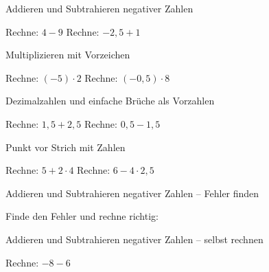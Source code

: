 \setcounter{aufgabe}{0}

\begin{aufgabe}{Addieren und Subtrahieren negativer Zahlen}
\begin{teile}
\teil Rechne: $4 - 9$ \leerfeld
\teil Rechne: $-2{,}5 + 1$ \leerfeld
\end{teile}
\end{aufgabe}

\begin{aufgabe}{Multiplizieren mit Vorzeichen}
\begin{teile}
\teil Rechne: $(-5) \cdot 2$ \leerfeld
\teil Rechne: $(-0{,}5) \cdot 8$ \leerfeld
\end{teile}
\end{aufgabe}

\begin{aufgabe}{Dezimalzahlen und einfache Brüche als Vorzahlen}
\begin{teile}
\teil Rechne: $1{,}5 + 2{,}5$ \leerfeld
\teil Rechne: $0{,}5 - 1{,}5$ \leerfeld
\end{teile}
\end{aufgabe}

\begin{aufgabe}{Punkt vor Strich mit Zahlen}
\begin{teile}
\teil Rechne: $5 + 2 \cdot 4$ \leerfeld
\teil Rechne: $6 - 4 \cdot 2{,}5$ \leerfeld
\end{teile}
\end{aufgabe}

\begin{aufgabe}{Addieren und Subtrahieren negativer Zahlen – Fehler finden}
\begin{teile}
\teil Finde den Fehler und rechne richtig: 
\end{teile}
\end{aufgabe}

\begin{aufgabe}{Addieren und Subtrahieren negativer Zahlen – selbst rechnen}
\begin{teile}
\teil Rechne: $-8 - 6$ \leerfeld
\end{teile}
\end{aufgabe}
